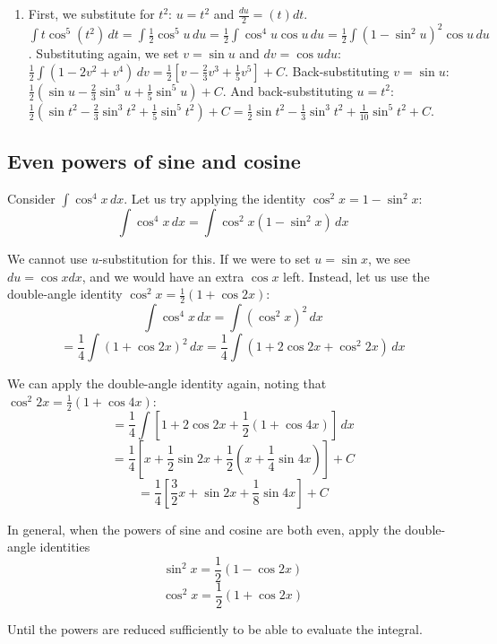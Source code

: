 \begin{Answer}[ref = power_1]
\begin{enumerate}
\item First, we substitute for $t^2$: $u = t^2$ and $\frac{du}{2} = (t)dt$. $
\int t \cos^5{\left( t^2 \right)}\,dt = \int \frac{1}{2}\cos^5{u}\,du = \frac{
1}{2} \int \cos^4{u} \cos{u}\,du = \frac{1}{2} \int \left( 1 - \sin^2{u} 
\right)^2 \cos{u}\,du$. Substituting again, we set $v = \sin{u}$ and $dv = 
\cos{u}du$: $\frac{1}{2} \int \left( 1 - 2v^2 + v^4 \right)\,dv = \frac{1}{2}
\left[ v - \frac{2}{3}v^3 + \frac{1}{5}v^5 \right] + C$. Back-substituting $v =
\sin{u}$: $\frac{1}{2} \left( \sin{u} - \frac{2}{3}\sin^3{u} + \frac{1}{5}\sin^
5{u} \right) + C$. And back-substituting $u = t^2$: $\frac{1}{2} \left( \sin{t^
2} - \frac{2}{3}\sin^3{t^2} + \frac{1}{5}\sin^5{t^2} \right) + C = \frac{1}{2}
\sin{t^2} - \frac{1}{3}\sin^3{t^2} + \frac{1}{10}\sin^5{t^2} + C$.
\end{enumerate}
\end{Answer}

\subsection{Even powers of sine and cosine}
Consider $\int \cos^4{x}\,dx$. Let us try applying the identity $\cos^2{x} = 1 -
\sin^2{x}$:
$$\int \cos^4{x}\,dx = \int \cos^2{x} \left( 1 - \sin^2{x} \right)\,dx$$

We cannot use $u$-substitution for this. If we were to set $u = \sin{x}$, we 
see $du = \cos{x} dx$, and we would have an extra $\cos{x}$ left. Instead, 
let us use the double-angle identity $\cos^2{x} = \frac{1}{2} \left( 1 + 
\cos{2x} \right)$:
$$\int \cos^4{x}\,dx = \int \left( \cos^2{x} \right)^2\,dx$$
$$= \frac{1}{4} \int \left( 1 + \cos{2x} \right)^2\,dx = \frac{1}{4} \int 
\left( 1 + 2\cos{2x} + \cos^2{2x} \right)\,dx$$

We can apply the double-angle identity again, noting that $\cos^2{2x} = 
\frac{1}{2} \left( 1 + \cos{4x} \right)$:
$$= \frac{1}{4} \int \left[ 1 + 2\cos{2x} + \frac{1}{2} \left( 1 + \cos{4x} \right) \right]\,dx$$
$$= \frac{1}{4} \left[ x + \frac{1}{2}\sin{2x} + \frac{1}{2} \left( x + 
\frac{1}{4}\sin{4x} \right) \right] + C$$
$$= \frac{1}{4} \left[\frac{3}{2}x + \sin{2x} + \frac{1}{8}\sin{4x} \right] + C$$

In general, when the powers of sine and cosine are both even, apply the 
double-angle identities
$$\sin^2{x} = \frac{1}{2} \left( 1 - \cos{2x} \right)$$
$$\cos^2{x} = \frac{1}{2} \left( 1 + \cos{2x} \right)$$

Until the powers are reduced sufficiently to be able to evaluate the integral. 

